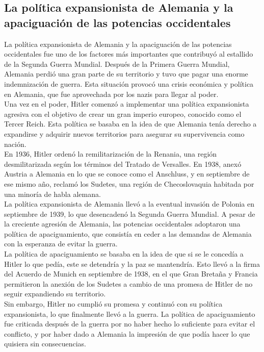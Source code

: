 \documentclass{article}
\theoremstyle{mytheoremstyle}
\theoremstyle{mytheoremstyle}
\theoremstyle{myproblemstyle}
\begin{document}
    \subsection{La política expansionista de Alemania y la apaciguación de las potencias occidentales}

La política expansionista de Alemania y la apaciguación de las potencias occidentales fue uno de los factores más importantes que contribuyó al estallido de la Segunda Guerra Mundial. Después de la Primera Guerra Mundial, Alemania perdió una gran parte de su territorio y tuvo que pagar una enorme indemnización de guerra. Esta situación provocó una crisis económica y política en Alemania, que fue aprovechada por los nazis para llegar al poder.\\

Una vez en el poder, Hitler comenzó a implementar una política expansionista agresiva con el objetivo de crear un gran imperio europeo, conocido como el Tercer Reich. Esta política se basaba en la idea de que Alemania tenía derecho a expandirse y adquirir nuevos territorios para asegurar su supervivencia como nación.\\

En 1936, Hitler ordenó la remilitarización de la Renania, una región desmilitarizada según los términos del Tratado de Versalles. En 1938, anexó Austria a Alemania en lo que se conoce como el Anschluss, y en septiembre de ese mismo año, reclamó los Sudetes, una región de Checoslovaquia habitada por una minoría de habla alemana.\\

La política expansionista de Alemania llevó a la eventual invasión de Polonia en septiembre de 1939, lo que desencadenó la Segunda Guerra Mundial. A pesar de la creciente agresión de Alemania, las potencias occidentales adoptaron una política de apaciguamiento, que consistía en ceder a las demandas de Alemania con la esperanza de evitar la guerra.\\

La política de apaciguamiento se basaba en la idea de que si se le concedía a Hitler lo que pedía, este se detendría y la paz se mantendría. Esto llevó a la firma del Acuerdo de Munich en septiembre de 1938, en el que Gran Bretaña y Francia permitieron la anexión de los Sudetes a cambio de una promesa de Hitler de no seguir expandiendo su territorio.\\

Sin embargo, Hitler no cumplió su promesa y continuó con su política expansionista, lo que finalmente llevó a la guerra. La política de apaciguamiento fue criticada después de la guerra por no haber hecho lo suficiente para evitar el conflicto, y por haber dado a Alemania la impresión de que podía hacer lo que quisiera sin consecuencias.\\
\end{document}

